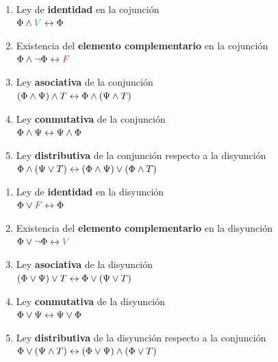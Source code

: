 {\noindent\raggedleft
\begin{minipage}{0.45\textwidth}
    \begin{enumerate}[label=\arabic*a]
        \item Ley de \textbf{identidad} en la cojunción\\
            $\Phi \land \ltrue \liff \Phi$
        \item Existencia del \textbf{elemento complementario} en la cojunción\\
            $\Phi \land \lnot \Phi \liff \lfalse$
        \item Ley \textbf{asociativa} de la conjunción\\
            $(\Phi \land \Psi) \land T \leftrightarrow \Phi \land (\Psi \land T)$
        \item Ley \textbf{conmutativa} de la conjunción\\
            $\Phi \land \Psi \leftrightarrow \Psi \land \Phi$
        \item Ley \textbf{distributiva} de la conjunción respecto a la
        disyunción\\
            $\Phi \land (\Psi \lor T) \leftrightarrow (\Phi \land \Psi) \lor (\Phi
            \land T)$
    \end{enumerate}
\end{minipage}
\begin{minipage}{0.45\textwidth}
    \begin{enumerate}[label=\arabic*b]
        \item Ley de \textbf{identidad} en la disyunción\\
            $\Phi \lor \lfalse \liff \Phi$
        \item Existencia del \textbf{elemento complementario} en la disyunción\\
            $\Phi \lor \lnot \Phi \liff \ltrue$
        \item Ley \textbf{asociativa} de la disyunción\\
            $(\Phi \lor \Psi) \lor T \leftrightarrow \Phi \lor (\Psi \lor T)$
        \item Ley \textbf{conmutativa} de la disyunción\\
            $\Phi \lor \Psi \leftrightarrow \Psi \lor \Phi$
        \item Ley \textbf{distributiva} de la disyunción respecto a la
        conjunción\\
            $\Phi \lor (\Psi \land T) \leftrightarrow (\Phi \lor \Psi) \land (\Phi \lor
            T)$
    \end{enumerate}
\end{minipage}
}


